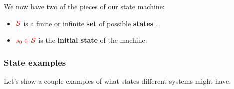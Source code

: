             We now have two of the pieces of our state machine:
            
            \begin{itemize}
                \item $\textcolor{red}{\mathcal{S}}$ is a finite or infinite \textbf{set} of possible \textbf{states} .
                \item $\textcolor{red}{s_0 \in \mathcal{S}}$ is the \textbf{initial state} of the machine. 
            \end{itemize}
        
        \subsecdiv
        
        \subsubsection{State examples}
            Let's show a couple examples of what states different systems might have.
            
